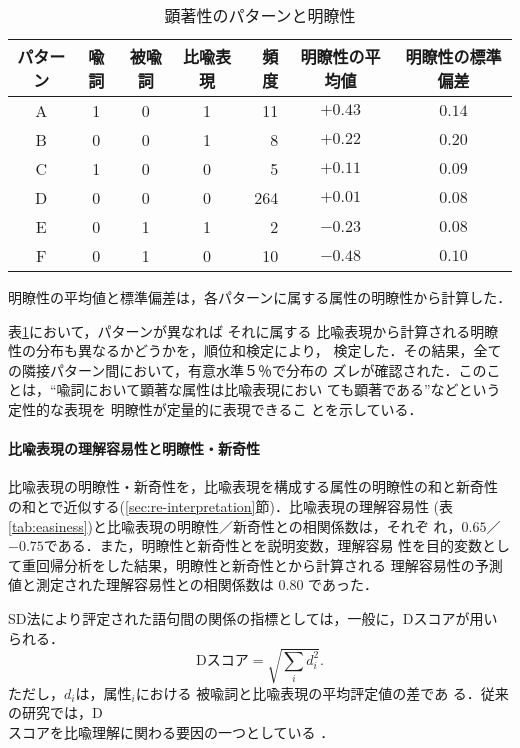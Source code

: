 \begin{table}[htbp]
  \begin{center}
    \leavevmode
    \begin{tabular}{|c|ccc|rcc|} \hline
      パターン & 喩詞 & 被喩詞 & 比喩表現 & 頻度 & 明瞭性の平均値 &明瞭性の標準偏差\\ \hline
      A & 1 & 0 & 1 &  11 & $+0.43$ & $0.14$\\
      B & 0 & 0 & 1 &   8 & $+0.22$ & $0.20$\\ \hline
      C & 1 & 0 & 0 &   5 & $+0.11$ & $0.09$\\
      D & 0 & 0 & 0 & 264 & $+0.01$ & $0.08$\\ \hline
      E & 0 & 1 & 1 &   2 & $-0.23$ & $0.08$\\
      F & 0 & 1 & 0 &  10 & $-0.48$ & $0.10$\\ \hline
    \end{tabular}
    
    \vspace{\baselineskip}
    
    明瞭性の平均値と標準偏差は，各パターンに属する属性の明瞭性から計算した．
    
  \end{center}
  \caption{顕著性のパターンと明瞭性}
  \label{tab:salience-patterns}
\end{table}

表\ref{tab:salience-patterns}において，パターンが異なれば それに属する
比喩表現から計算される明瞭性の分布も異なるかどうかを，順位和検定により，
検定した．その結果，全ての隣接パターン間において，有意水準５％で分布の
ズレが確認された．このことは，``喩詞において顕著な属性は比喩表現におい
ても顕著である''などという定性的な表現を 明瞭性が定量的に表現できるこ
とを示している．

\paragraph{比喩表現の理解容易性と明瞭性・新奇性}

比喩表現の明瞭性・新奇性を，比喩表現を構成する属性の明瞭性の和と新奇性
の和とで近似する(\ref{sec:re-interpretation}節)．比喩表現の理解容易性
(表\ref{tab:easiness})と比喩表現の明瞭性／新奇性との相関係数は，それぞ
れ，$0.65$／$-0.75$である．また，明瞭性と新奇性とを説明変数，理解容易
性を目的変数として重回帰分析をした結果，明瞭性と新奇性とから計算される
理解容易性の予測値と測定された理解容易性との相関係数は 0.80 であった．

SD法により評定された語句間の関係の指標としては，一般に，Dスコアが用い
られる．
\begin{displaymath}
  \mbox{Dスコア} = \sqrt{\sum_i d_i^2}.
\end{displaymath}
ただし，\hspace{-0.2mm}$d_i$は，\hspace{-0.2mm}属性$_i$における \hspace{-0.2mm}被喩詞と比喩表現の平均評定値の差であ
る．\hspace{-0.2mm}従来の研究では，\hspace{-0.2mm}D\\スコアを比喩理解に関わる要因の一つとしている
\cite[など]{Tourangeau82,Kusumi87}．

